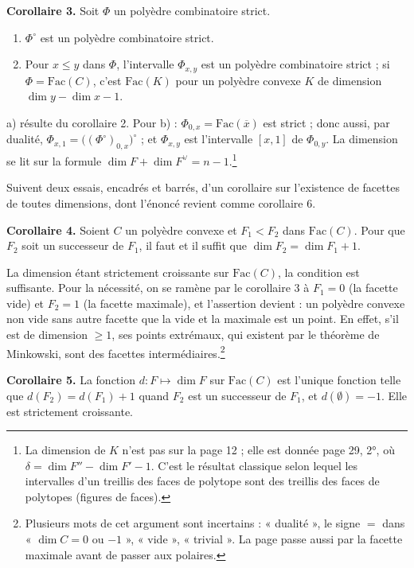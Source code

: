 \documentclass[11pt,a4paper]{article}
\begin{document}
\textbf{Corollaire 3.} Soit $\Phi$ un polyèdre combinatoire strict.
\begin{enumerate}
\item[a)] $\Phi^{\circ}$ est un polyèdre combinatoire strict.
\item[b)] Pour $x \leq y$ dans $\Phi$, l'intervalle $\Phi_{x,y}$ est un polyèdre
combinatoire strict ; si $\Phi = \mathrm{Fac}(C)$, c'est $\mathrm{Fac}(K)$ pour
un polyèdre convexe $K$ de dimension $\dim y - \dim x - 1$.
\end{enumerate}

a) résulte du corollaire 2. Pour b) : $\Phi_{0,x} = \mathrm{Fac}(\overline{x})$
est strict ; donc aussi, par dualité, $\Phi_{x,1} = \bigl((\Phi^{\circ})_{0,x}
\bigr)^{\circ}$ ; et $\Phi_{x,y}$ est l'intervalle $[x, 1]$ de $\Phi_{0,y}$. La
dimension se lit sur la formule $\dim F + \dim F^{\vee} = n - 1$.\footnote{La
dimension de $K$ n'est pas sur la page 12 ; elle est donnée page 29, 2°, où
$\delta = \dim F'' - \dim F' - 1$. C'est le résultat classique selon lequel les
intervalles d'un treillis des faces de polytope sont des treillis des faces de
polytopes (figures de faces).}

Suivent deux essais, encadrés et barrés, d'un corollaire sur l'existence de
facettes de toutes dimensions, dont l'énoncé revient comme corollaire 6.

\textbf{Corollaire 4.} Soient $C$ un polyèdre convexe et $F_{1} < F_{2}$ dans
$\mathrm{Fac}(C)$. Pour que $F_{2}$ soit un successeur de $F_{1}$, il faut et il
suffit que $\dim F_{2} = \dim F_{1} + 1$.

La dimension étant strictement croissante sur $\mathrm{Fac}(C)$, la condition
est suffisante. Pour la nécessité, on se ramène par le corollaire 3 à
$F_{1} = 0$ (la facette vide) et $F_{2} = 1$ (la facette maximale), et
l'assertion devient : un polyèdre convexe non vide sans autre facette que la
vide et la maximale est un point. En effet, s'il est de dimension $\geq 1$, ses
points extrémaux, qui existent par le théorème de Minkowski, sont des facettes
intermédiaires.\footnote{Plusieurs mots de cet argument sont incertains :
« dualité », le signe $=$ dans « $\dim C = 0$ ou $-1$ », « vide »,
« trivial ». La page passe aussi par la facette maximale avant de passer aux
polaires.}

\textbf{Corollaire 5.} La fonction $d : F \mapsto \dim F$ sur $\mathrm{Fac}(C)$
est l'unique fonction telle que $d(F_{2}) = d(F_{1}) + 1$ quand $F_{2}$ est un
successeur de $F_{1}$, et $d(\emptyset) = -1$. Elle est strictement croissante.
\end{document}
